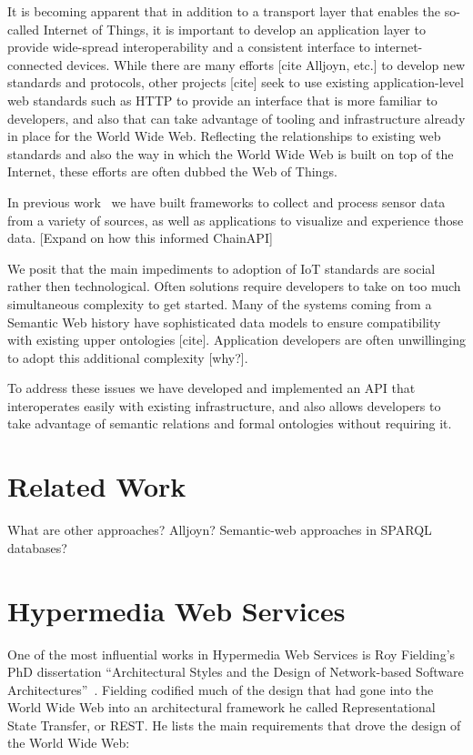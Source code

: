 \documentclass{acm_proc_article-sp}
\begin{document}
It is becoming apparent that in addition to a transport layer that enables the
so-called Internet of Things, it is important to develop an application layer
to provide wide-spread interoperability and a consistent interface to
internet-connected devices. While there are many efforts [cite Alljoyn, etc.]
to develop new standards and protocols, other projects [cite] seek to use
existing application-level web standards such as HTTP to provide an interface
that is more familiar to developers, and also that can take advantage of
tooling and infrastructure already in place for the World Wide Web. Reflecting
the relationships to existing web standards and also the way in which the World
Wide Web is built on top of the Internet, these efforts are often dubbed the
Web of Things.

In previous work~\cite{doppellab}\cite{gestures} we have built frameworks to collect
and process sensor data from a variety of sources, as well as applications to
visualize and experience those data. [Expand on how this informed ChainAPI]

We posit that the main impediments to adoption of IoT standards are social
rather then technological. Often  solutions require developers to take on too much
simultaneous complexity to get started. Many of the systems coming from a Semantic
Web history have sophisticated data models to ensure compatibility with existing
upper ontologies [cite]. Application developers are often unwillinging to adopt
this additional complexity [why?].

To address these issues we have developed and implemented an API that interoperates
easily with existing infrastructure, and also allows developers to take advantage
of semantic relations and formal ontologies without requiring it.

\section{Related Work}

What are other approaches? Alljoyn? Semantic-web approaches in SPARQL
databases?

\section{Hypermedia Web Services}

One of the most influential works in Hypermedia Web Services is Roy Fielding's
PhD dissertation ``Architectural Styles and the Design of Network-based
Software Architectures''~\cite{fielding}. Fielding codified much of the design
that had gone into the World Wide Web into an architectural framework he called
Representational State Transfer, or REST. He lists the main requirements that
drove the design of the World Wide Web:
\end{document}
